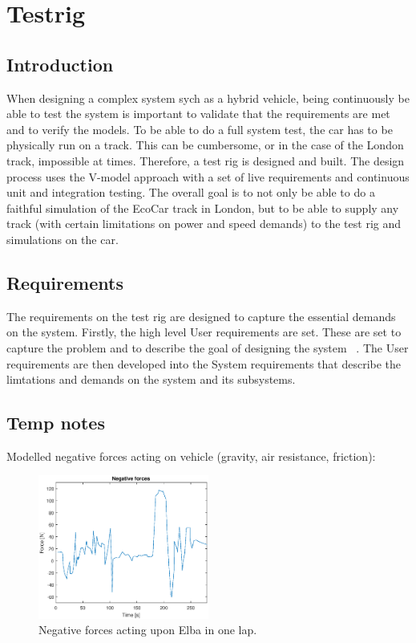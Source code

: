 \chapter{Testrig}
\section{Introduction}
When designing a complex system sych as a hybrid vehicle, being continuously be
able to test the system is important to validate that the requirements are met
and to verify the models. To be able to do a full system test, the car has to be
physically run on a track. This can be cumbersome, or in the case of the London
track, impossible at times. Therefore, a test rig is designed and built. The
design process uses the V-model approach with a set of live requirements and
continuous unit and integration testing. The overall goal is to not only be able
to do a faithful simulation of the EcoCar track in London, but to be able to
supply any track (with certain limitations on power and speed demands) to the
test rig and simulations on the car.

\section{Requirements}
The requirements on the test rig are designed to capture the essential demands
on the system. Firstly, the high level User requirements are set. These are set
to capture the problem and to describe the goal of designing the system
~\cite{ibm_req}. The User requirements are then developed into the System
requirements that describe the limtations and demands on the system and its
subsystems.

\section{Temp notes}
Modelled negative forces acting on vehicle (gravity, air resistance, friction): 

\begin{figure}[H]
    \centering
    \label{fig:testrig_negative_forces}
    \includegraphics[width=0.5\textwidth]{./img/testrig_negative_forces.eps}
    \caption{Negative forces acting upon Elba in one lap.}
\end{figure}


